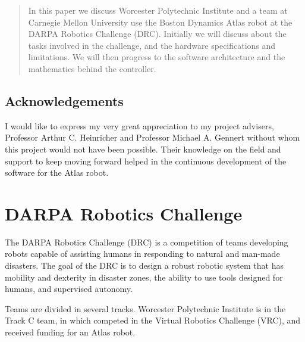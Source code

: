 \documentclass[12pt]{report}
\begin{document}
\setcounter{page}{1}
\begin{abstract}

In this paper we discuss Worcester Polytechnic Institute and a team at Carnegie Mellon University use the Boston Dynamics Atlas robot at the DARPA Robotics Challenge (DRC). Initially we will discuss about the tasks involved in the challenge, and the hardware specifications and limitations. We will then progress to the software architecture and the mathematics behind the controller. 


\end{abstract}

\newpage

\section*{Acknowledgements}
I would like to express my very great appreciation to my project advisers, Professor Arthur C. Heinricher and Professor Michael A. Gennert without whom this project would not have been possible. Their knowledge on the field and support to keep moving forward helped in the continuous development of the software for the Atlas robot. 

\newpage
\setcounter{page}{1}
\renewcommand{\thepage}{\roman{page}}
\pagestyle{plain}

\newpage
\tableofcontents
\newpage
\renewcommand{\thepage}{\arabic{page}}
\setcounter{page}{1}
\pagestyle{plain}
\chapter{DARPA Robotics Challenge}
 
The DARPA Robotics Challenge (DRC) is a competition of teams developing robots capable of assisting humans in responding to natural and man-made disasters. The goal of the DRC is to design a robust robotic system that has mobility and dexterity in disaster zones, the ability to use tools designed for humans, and supervised autonomy.
 
Teams are divided in several tracks. Worcester Polytechnic Institute is in the Track C team, in which competed in the Virtual Robotics Challenge (VRC), and received funding for an Atlas robot.  
\end{document}
